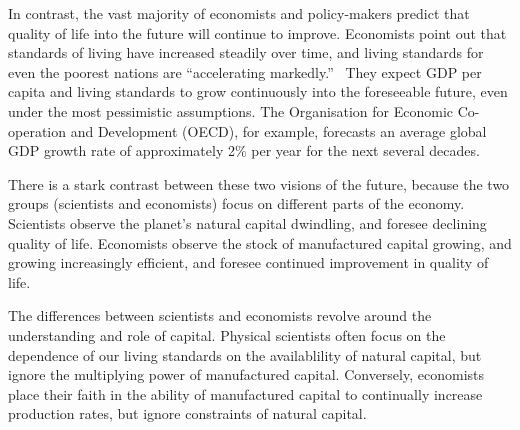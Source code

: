In contrast, the vast majority of economists and policy-makers predict 
that quality of life into the future will continue to improve. 
Economists point out that standards of living have increased steadily over time,
and living standards for even the poorest nations 
are ``accelerating markedly.''~\cite{Malik:2013aa} 
They expect GDP per capita and living standards to
grow continuously into the foreseeable future,
even under the most pessimistic assumptions.\cite[p.~170]{Malik:2013aa} 
The Organisation for Economic Co-operation and Development (OECD), 
for example, forecasts an average global GDP
growth rate of approximately 2\% per year 
for the next several decades.\cite[Table A.1]{OECD2012}

There is a stark contrast between these two visions of the future, 
because the two groups (scientists and economists) focus on 
different parts of the economy.
Scientists observe the planet's natural capital dwindling, 
and foresee declining quality of life.
Economists observe the stock of manufactured capital growing, 
and growing increasingly efficient, 
and foresee continued improvement in quality of life. 

The differences between scientists and economists revolve around 
the understanding and role of capital.
Physical scientists often focus on the dependence of our
living standards on the availablility of natural capital, but ignore the 
multiplying power of manufactured capital. Conversely,
economists place their faith in the ability of manufactured capital 
to continually increase production rates, 
but ignore constraints of natural capital.


\vspace{10 mm}

